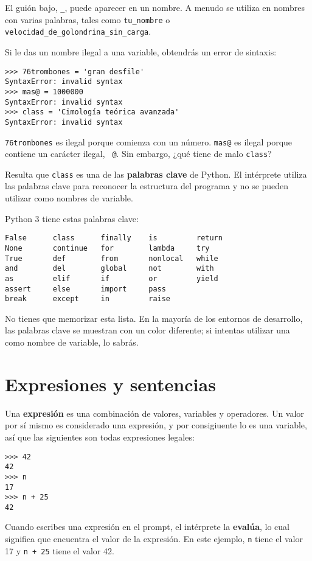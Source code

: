 \documentclass[10pt]{book}
\begin{document}
El guión bajo, \verb"_", puede aparecer en un nombre.
A menudo se utiliza en nombres con varias palabras, tales como
\verb"tu_nombre" o \verb"velocidad_de_golondrina_sin_carga".

Si le das un nombre ilegal a una variable, obtendrás un error de sintaxis:

\begin{verbatim}
>>> 76trombones = 'gran desfile'
SyntaxError: invalid syntax
>>> mas@ = 1000000
SyntaxError: invalid syntax
>>> class = 'Cimología teórica avanzada'
SyntaxError: invalid syntax
\end{verbatim}
%
{\tt 76trombones} es ilegal porque comienza con un número.
{\tt mas@} es ilegal porque contiene un carácter ilegal, {\tt
@}.  Sin embargo, ¿qué tiene de malo {\tt class}?

Resulta que {\tt class} es una de las {\bf palabras clave} de Python.  El
intérprete utiliza las palabras clave para reconocer la estructura del programa
y no se pueden utilizar como nombres de variable.

Python 3 tiene estas palabras clave:

\begin{verbatim}
False      class      finally    is         return
None       continue   for        lambda     try
True       def        from       nonlocal   while
and        del        global     not        with
as         elif       if         or         yield
assert     else       import     pass
break      except     in         raise
\end{verbatim}
%
No tienes que memorizar esta lista.  En la mayoría de los entornos de desarrollo,
las palabras clave se muestran con un color diferente; si intentas utilizar una
como nombre de variable, lo sabrás.


\section{Expresiones y sentencias}

Una {\bf expresión} es una combinación de valores, variables y operadores.
Un valor por sí mismo es considerado una expresión, y por consigiuente lo es
una variable, así que las siguientes son todas expresiones legales:

\begin{verbatim}
>>> 42
42
>>> n
17
>>> n + 25
42
\end{verbatim}
%
Cuando escribes una expresión en el prompt, el intérprete
la {\bf evalúa}, lo cual significa que encuentra el valor de
la expresión.
En este ejemplo, {\tt n} tiene el valor 17 y
{\tt n + 25} tiene el valor 42.
\end{document}
